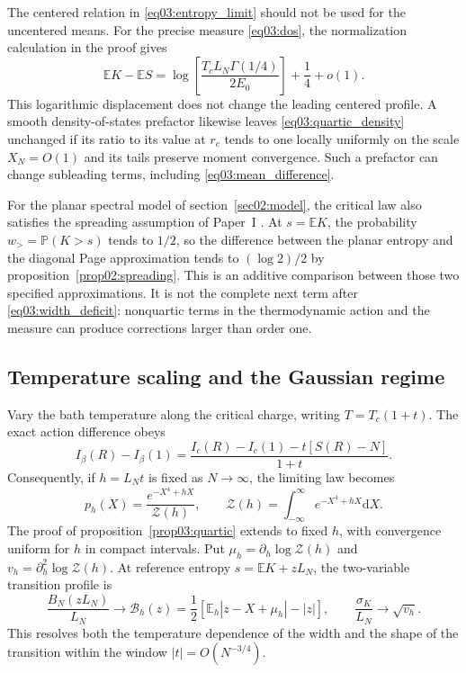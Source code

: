 \documentclass[11pt,letterpaper]{article}
\newcommand{\E}{\mathbb{E}}
\newcommand{\Prob}{\mathbb{P}}
\newcommand{\dd}{\mathrm{d}}
\theoremstyle{plain}
\theoremstyle{definition}
\theoremstyle{remark}
\begin{document}
The centered relation in \eqref{eq03:entropy_limit} should not be
used for the uncentered means.  For the precise measure
\eqref{eq03:dos}, the normalization calculation in the proof gives
\begin{equation}
 \E K-\E S
  =\log\!\left[\frac{T_c L_N\Gamma(1/4)}{2E_0}\right]
       +\frac14+o(1).
 \label{eq03:mean_difference}
\end{equation}
This logarithmic displacement does not change the leading centered
profile.  A smooth density-of-states prefactor likewise leaves
\eqref{eq03:quartic_density} unchanged if its ratio to its value at
$r_c$ tends to one locally uniformly on the scale $X_N=O(1)$ and
its tails preserve moment convergence.  Such a prefactor can change
subleading terms, including \eqref{eq03:mean_difference}.

For the planar spectral model of section~\ref{sec02:model}, the
critical law also satisfies the spreading assumption of Paper~I
\cite{wuebben2026}.  At $s=\E K$, the probability $w_>=\Prob(K>s)$
tends to $1/2$, so the difference between the planar entropy and
 the diagonal Page approximation tends to $(\log2)/2$ by
 proposition~\ref{prop02:spreading}.  This is an
additive comparison between those two specified approximations.
It is not the complete next term after \eqref{eq03:width_deficit}:
nonquartic terms in the thermodynamic action and the measure can
produce corrections larger than order one.

\subsection{Temperature scaling and the Gaussian regime}

Vary the bath temperature along the critical charge, writing
$T=T_c(1+t)$.  The exact action difference obeys
\begin{equation}
 I_\beta(R)-I_\beta(1)
  =\frac{I_c(R)-I_c(1)-t[S(R)-N]}{1+t}.
 \label{eq03:thermal_action}
\end{equation}
Consequently, if $h=L_Nt$ is fixed as $N\to\infty$, the limiting
law becomes
\begin{equation}
 p_h(X)=\frac{e^{-X^4+hX}}{\mathcal Z(h)},\qquad
 \mathcal Z(h)=\int_{-\infty}^\infty e^{-X^4+hX}\dd X.
 \label{eq03:tilted_density}
\end{equation}
The proof of proposition~\ref{prop03:quartic} extends to fixed $h$,
with convergence uniform for $h$ in compact intervals.  Put
$\mu_h=\partial_h\log\mathcal Z(h)$ and
$v_h=\partial_h^2\log\mathcal Z(h)$.  At reference entropy
$s=\E K+zL_N$, the two-variable transition profile is
\begin{equation}
 \frac{B_N(zL_N)}{L_N}\longrightarrow
 \mathcal B_h(z)
 =\frac12\left[\E_h|z-X+\mu_h|-|z|\right],
 \qquad \frac{\sigma_K}{L_N}\longrightarrow\sqrt{v_h}.
 \label{eq03:thermal_profile}
\end{equation}
This resolves both the temperature dependence of the width and the
shape of the transition within the window $|t|=O(N^{-3/4})$.
\end{document}
